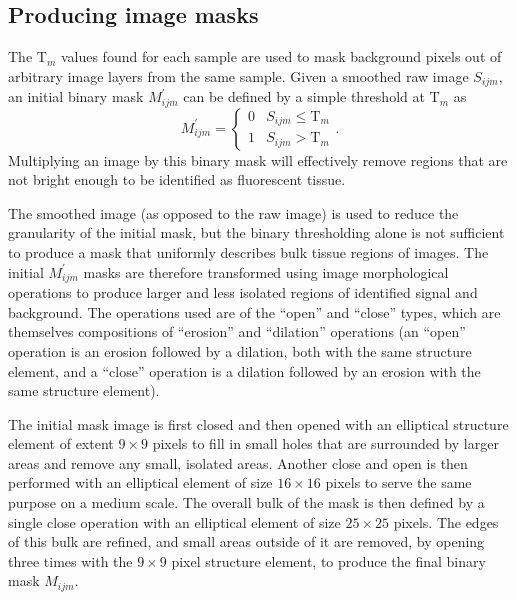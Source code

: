 \documentclass[letterpaper,11pt]{article}
\newcommand{\Tau}{\mathrm{T}}
\begin{document}
\subsection{Producing image masks}
\label{ssec:producing_image_masks}

The $\Tau_{m}$ values found for each sample are used to mask background pixels out of arbitrary image layers from the same sample. Given a smoothed raw image $S_{ijm}$, an initial binary mask $M^{\prime}_{ijm}$ can be defined by a simple threshold at $\Tau_{m}$ as
\begin{equation}
M^{\prime}_{ijm} = 
\begin{cases} 
      0 & S_{ijm} \leq \Tau_{m} \\
      1 & S_{ijm} > \Tau_{m} 
\end{cases}
 .
\end{equation}
Multiplying an image by this binary mask will effectively remove regions that are not bright enough to be identified as fluorescent tissue.

The smoothed image (as opposed to the raw image) is used to reduce the granularity of the initial mask, but the binary thresholding alone is not sufficient to produce a mask that uniformly describes bulk tissue regions of images. The initial $M^{\prime}_{ijm}$ masks are therefore transformed using image morphological operations \cite{opencv_mt} to produce larger and less isolated regions of identified signal and background. The operations used are of the ``open'' and ``close'' types, which are themselves compositions of ``erosion'' and ``dilation'' operations (an ``open'' operation is an erosion followed by a dilation, both with the same structure element, and a ``close'' operation is a dilation followed by an erosion with the same structure element).

The initial mask image is first closed and then opened with an elliptical structure element of extent $9 \times 9$ pixels to fill in small holes that are surrounded by larger areas and remove any small, isolated areas. Another close and open is then performed with an elliptical element of size $16 \times 16$ pixels to serve the same purpose on a medium scale. The overall bulk of the mask is then defined by a single close operation with an elliptical element of size $25 \times 25$ pixels. The edges of this bulk are refined, and small areas outside of it are removed, by opening three times with the $9 \times 9$ pixel structure element, to produce the final binary mask $M_{ijm}$.
\end{document}
